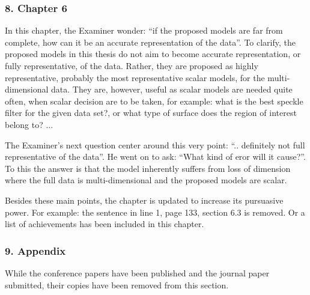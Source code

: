 \subsubsection*{8. Chapter 6}

In this chapter, the Examiner wonder: ``if the proposed models are far from complete, how can it be an accurate representation of the data''.
To clarify, the proposed models in this thesis do not aim to become accurate representation, or fully representative, of the data.
Rather, they are proposed as highly representative, probably the most representative scalar models, for the multi-dimensional data.
They are, however, useful as scalar models are needed quite often, when scalar decision are to be taken,
  for example: what is the best speckle filter for the given data set?, or what type of surface does the region of interest belong to? ...

The Examiner's next question center around this very point: ``.. definitely not full representative of the data''.
He went on to ask: ``What kind of eror will it cause?''.
To this the answer is that the model inherently suffers from loss of dimension
  where the full data is multi-dimensional and the proposed models are scalar.

Besides these main points, the chapter is updated to increase its pursuasive power.
For example: the sentence in line 1, page 133, section 6.3 is removed.
Or a list of achievements has been included in this chapter.

\subsubsection*{9. Appendix}

While the conference papers have been published and the journal paper submitted,
  their copies have been removed from this section.



